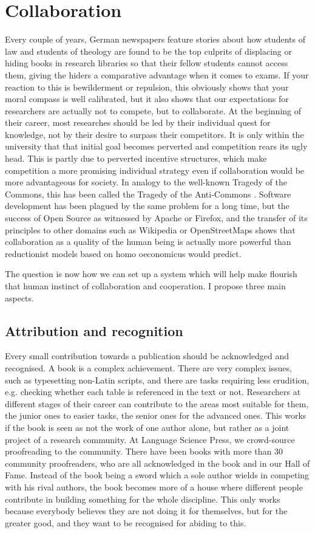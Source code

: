 \documentclass[12pt]{article}
\begin{document}
\section{Collaboration}
Every couple of years, German newspapers feature stories about how students of law and students of theology are found to be the top culprits of displacing or hiding books in research libraries so that their fellow students cannot access them, giving the hiders a comparative advantage when it comes to exams. If your reaction to this is bewilderment or repulsion, this obviously shows that your moral compass is well calibrated, but it also shows that our expectations for researchers are actually not to compete, but to collaborate. At the beginning of their career, most researches should be led by their individual quest for knowledge, not by their desire to surpass their competitors. It is only within the university that that initial goal becomes perverted and competition rears its ugly head. This is partly due to perverted incentive structures, which make competition a more promising individual strategy even if collaboration would be more advantageous for society. In analogy to the well-known Tragedy of the Commons, this has been called the Tragedy of the Anti-Commons \citep{Heller1998}. Software development has been plagued by the same problem for a long time,  but the success of Open Source as witnessed by Apache or Firefox, and the transfer of its principles to other domains such as Wikipedia or OpenStreetMaps shows that collaboration as a quality of the human being is actually more powerful than reductionist models based on homo oeconomicus would predict.

The question is now how we can set up a system which will help make flourish that human instinct of collaboration and cooperation. 
I propose three main aspects.

\subsection{Attribution and recognition}
Every small contribution towards a publication should be acknowledged and recognised. A book is a complex achievement. There are very complex issues, such as typesetting non-Latin scripts, and there are tasks requiring less erudition, e.g. checking whether each table is referenced in the text or not. Researchers at different stages of their career can contribute to the areas most suitable for them, the junior ones to easier tasks, the senior ones for the advanced ones. This works if the book is seen as not the work of one author alone, but rather as a joint project of a research community. At Language Science Press, we crowd-source proofreading to the community. There have been books with more than 30 community proofreaders, who are all acknowledged in the book and in our Hall of Fame. Instead of the book being a sword which a sole author wields in competing with his rival authors, the book becomes more of a house where different people contribute in building something for the whole discipline. This only works because everybody believes they are not doing it for themselves, but for the greater good, and they want to be recognised for abiding to this. 
\end{document}
